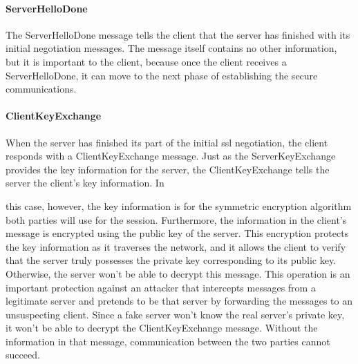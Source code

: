 \paragraph{ServerHelloDone}
The ServerHelloDone message tells the client that the server has finished with
 its initial negotiation messages. The message itself contains no other 
 information, but it is important to the client, because
once the client receives a ServerHelloDone, it can move to the next
phase of establishing the secure communications.
\paragraph{ClientKeyExchange}
When the server has finished its part of the initial ssl negotiation,
the client responds with a ClientKeyExchange message. Just as the
ServerKeyExchange provides the key information for the server, the
ClientKeyExchange tells the server the client’s key information. In

this case, however, the key information is for the symmetric encryption 
algorithm both parties will use for the session. Furthermore, the
information in the client’s message is encrypted using the public key
of the server. This encryption protects the key information as it traverses
 the network, and it allows the client to verify that the server
truly possesses the private key corresponding to its public key. Otherwise,
 the server won’t be able to decrypt this message. This operation is an 
 important protection against an attacker that intercepts
messages from a legitimate server and pretends to be that server by
forwarding the messages to an unsuspecting client. Since a fake
server won’t know the real server’s private key, it won’t be able to decrypt 
the ClientKeyExchange message. Without the information in
that message, communication between the two parties cannot succeed.
